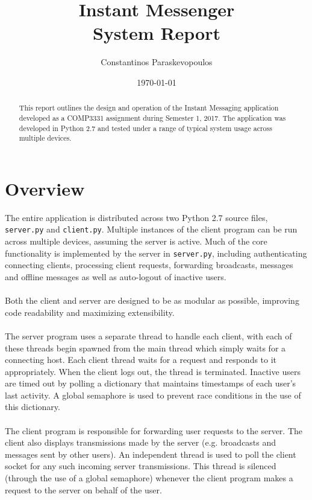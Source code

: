 \documentclass[12pt,a4paper]{article}
\title{Instant Messenger \\ \large System Report}
\author{Constantinos Paraskevopoulos}
\date{\today}
\begin{document}
\maketitle

\begin{abstract}
This report outlines the design and operation of the Instant Messaging application developed as a COMP3331 assignment during Semester 1, 2017. The application was developed in Python 2.7 and tested under a range of typical system usage across multiple devices.
\end{abstract}

\section{Overview}
\label{sec:overview}

The entire application is distributed across two Python 2.7 source files, \verb|server.py| and \verb|client.py|. Multiple instances of the client program can be run across multiple devices, assuming the server is active. Much of the core functionality is implemented by the server in \verb|server.py|, including authenticating connecting clients, processing client requests, forwarding broadcasts, messages and offline messages as well as auto-logout of inactive users.
\\\\
Both the client and server are designed to be as modular as possible, improving code readability and maximizing extensibility.
\\\\
The server program uses a separate thread to handle each client, with each of these threads begin spawned from the main thread which simply waits for a connecting host. Each client thread waits for a request and responds to it appropriately. When the client logs out, the thread is terminated. Inactive users are timed out by polling a dictionary that maintains timestamps of each user's last activity. A global semaphore is used to prevent race conditions in the use of this dictionary.
\\\\
The client program is responsible for forwarding user requests to the server. The client also displays transmissions made by the server (e.g. broadcasts and messages sent by other users). An independent thread is used to poll the client socket for any such incoming server transmissions. This thread is silenced (through the use of a global semaphore) whenever the client program makes a request to the server on behalf of the user.
\end{document}
